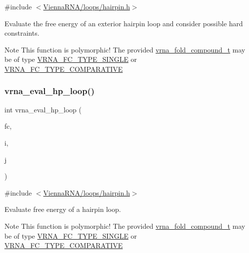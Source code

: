 {\ttfamily \#include $<$\mbox{\hyperlink{hairpin_8h}{Vienna\+R\+N\+A/loops/hairpin.\+h}}$>$}



Evaluate the free energy of an exterior hairpin loop and consider possible hard constraints. 

\begin{DoxyNote}{Note}
This function is polymorphic! The provided \mbox{\hyperlink{group__fold__compound_ga1b0cef17fd40466cef5968eaeeff6166}{vrna\+\_\+fold\+\_\+compound\+\_\+t}} may be of type \mbox{\hyperlink{group__fold__compound_gga01a4ff86fa71deaaa5d1abbd95a1447da7e264dd3cf2dc9b6448caabcb7763cd6}{V\+R\+N\+A\+\_\+\+F\+C\+\_\+\+T\+Y\+P\+E\+\_\+\+S\+I\+N\+G\+LE}} or \mbox{\hyperlink{group__fold__compound_gga01a4ff86fa71deaaa5d1abbd95a1447dab821ce46ea3cf665be97df22a76f5023}{V\+R\+N\+A\+\_\+\+F\+C\+\_\+\+T\+Y\+P\+E\+\_\+\+C\+O\+M\+P\+A\+R\+A\+T\+I\+VE}} 
\end{DoxyNote}
\mbox{\label{group__eval__loops__hp_gad0bb844f8dc704c71737ae1d7e32b975}} 
\subsubsection{\texorpdfstring{vrna\_eval\_hp\_loop()}{vrna\_eval\_hp\_loop()}}
{\footnotesize\ttfamily int vrna\+\_\+eval\+\_\+hp\+\_\+loop (\begin{DoxyParamCaption}\item[{\mbox{\hyperlink{group__fold__compound_ga1b0cef17fd40466cef5968eaeeff6166}{vrna\+\_\+fold\+\_\+compound\+\_\+t}} $\ast$}]{fc,  }\item[{int}]{i,  }\item[{int}]{j }\end{DoxyParamCaption})}



{\ttfamily \#include $<$\mbox{\hyperlink{hairpin_8h}{Vienna\+R\+N\+A/loops/hairpin.\+h}}$>$}



Evaluate free energy of a hairpin loop. 

\begin{DoxyNote}{Note}
This function is polymorphic! The provided \mbox{\hyperlink{group__fold__compound_ga1b0cef17fd40466cef5968eaeeff6166}{vrna\+\_\+fold\+\_\+compound\+\_\+t}} may be of type \mbox{\hyperlink{group__fold__compound_gga01a4ff86fa71deaaa5d1abbd95a1447da7e264dd3cf2dc9b6448caabcb7763cd6}{V\+R\+N\+A\+\_\+\+F\+C\+\_\+\+T\+Y\+P\+E\+\_\+\+S\+I\+N\+G\+LE}} or \mbox{\hyperlink{group__fold__compound_gga01a4ff86fa71deaaa5d1abbd95a1447dab821ce46ea3cf665be97df22a76f5023}{V\+R\+N\+A\+\_\+\+F\+C\+\_\+\+T\+Y\+P\+E\+\_\+\+C\+O\+M\+P\+A\+R\+A\+T\+I\+VE}}
\end{DoxyNote}

